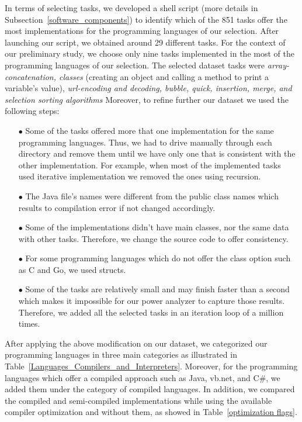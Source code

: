 In terms of selecting tasks, we developed a shell script (more 
details in Subsection~\ref{software_components}) to identify 
which of the 851 tasks offer the most implementations for the 
programming languages of our selection.
After launching our script, we obtained around 29 different tasks. 
For the context of our preliminary study, we choose only 
nine tasks implemented in the most of the programming languages 
of our selection. 
The selected dataset tasks were \textit{array-concatenation, classes} 
(creating an object and calling a method to print a variable's value), 
\textit{url-encoding and decoding, bubble, quick, insertion, merge, 
	and selection sorting algorithms}
Moreover, to refine further our dataset we used the following steps: 

\begin{enumerate}
	\item [$\bullet$] Some of the tasks offered more that one implementation 
	for the same programming languages. 
	Thus, we had to drive manually through each directory and remove 
	them until we have only one that is consistent with the other 
	implementation. 
	For example, when most of the implemented tasks used iterative implementation 
	we removed the ones using recursion. 
	\item [$\bullet$] The Java file's names were 
	different from the public class names which results to compilation 
	error if not changed accordingly. 
	\item [$\bullet$] Some of the implementations didn't have main 
	classes, nor the same data with other tasks. 
	Therefore, we change the source code to offer consistency.
	\item [$\bullet$] For some programming languages which do not offer 
	the class option such as C and Go, we used structs. 
	\item [$\bullet$] Some of the tasks are relatively small and may 
	finish faster than a second which makes it impossible for our 
	power analyzer to capture those results. 
	Therefore, we added all the selected tasks in an iteration loop of 
	a million times. 
\end{enumerate}

After applying the above modification on our dataset, we categorized our 
programming languages in three main categories as illustrated in 
Table~\ref{Languages_Compilers_and_Interpreters}. 
Moreover, for the programming languages which offer a compiled approach 
such as Java, {\sc vb.net}, and C\#, we added them under the category of 
compiled languages. 
In addition, we compared the compiled and semi-compiled implementations while 
using the available compiler optimization and without them, as showed in 
Table~\ref{optimization flags}.

